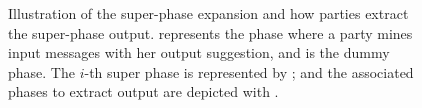 \begin{figure}[ht]
    \caption{Illustration of the super-phase expansion and how parties extract the super-phase output.  represents the phase where a party mines input messages with her output suggestion, and  is the dummy phase. The $i$-th super phase is represented by ; and the associated phases to extract output are depicted with .}
    \label{fig:super-phase-expansion}
\end{figure}